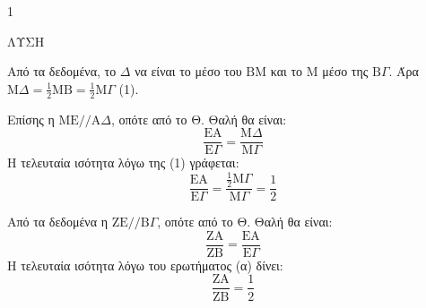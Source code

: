 \begin{ylh}{1}
    \item [Ύλη από εικόνα]
\end{ylh}
ΛΥΣΗ
\begin{alist}
\item Από τα δεδομένα, το $\Delta$ να είναι το μέσο του $\text{BM}$ και το $\text{M}$ μέσο της $\text{B}\Gamma$.
    Άρα $\text{M}\Delta = \frac{1}{2} \text{MB} = \frac{1}{2} \text{M}\Gamma$ (1).

    Επίσης η $\text{ME} // \text{A}\Delta$, οπότε από το Θ. Θαλή θα είναι:
    \[ \frac{\text{EA}}{\text{E}\Gamma} = \frac{\text{M}\Delta}{\text{M}\Gamma} \]
    Η τελευταία ισότητα λόγω της (1) γράφεται:
    \[ \frac{\text{EA}}{\text{E}\Gamma} = \frac{\frac{1}{2}\text{M}\Gamma}{\text{M}\Gamma} = \frac{1}{2} \]

\item Από τα δεδομένα η $\text{ZE} // \text{B}\Gamma$, οπότε από το Θ. Θαλή θα είναι:
    \[ \frac{\text{ZA}}{\text{ZB}} = \frac{\text{EA}}{\text{E}\Gamma} \]
    Η τελευταία ισότητα λόγω του ερωτήματος (α) δίνει:
    \[ \frac{\text{ZA}}{\text{ZB}} = \frac{1}{2} \]
\end{alist}